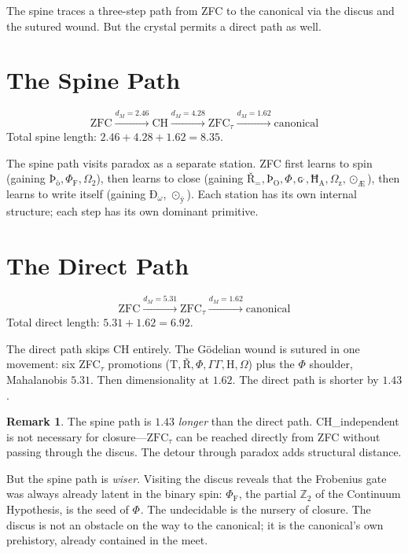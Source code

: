 \documentclass[12pt,twoside]{book}
\theoremstyle{definition}
\newtheorem{remark}[theorem]{Remark}
\newcommand{\ZFCt}{\text{ZFC}_{\tau}}
\newcommand{\prim}[1]{\text{#1}}
\begin{document}
The spine traces a three-step path from ZFC to the canonical via the discus and the sutured wound. But the crystal permits a direct path as well.

\section{The Spine Path}

\begin{equation}
\text{ZFC} \xrightarrow{d_M = 2.46} \text{CH} \xrightarrow{d_M = 4.28} \ZFCt \xrightarrow{d_M = 1.62} \text{canonical}
\end{equation}
Total spine length: $2.46 + 4.28 + 1.62 = 8.35$.

The spine path visits paradox as a separate station. ZFC first learns to spin (gaining $\text{Þ}_{\text{ò}}, \Phi_{\text{F}}, \Omega_{\text{2}}$), then learns to close (gaining $\text{Ř}_{\text{=}}, \text{Þ}_{\text{O}}, \Phi_{\text{}}, \text{ɢ}^{\text{ˌ}}, \text{Ħ}_{\text{A}}, \Omega_{\text{z}}, \odot_{\text{Æ}}$), then learns to write itself (gaining $\text{Ð}_{\omega}$, $\odot_{\text{ÿ}}$). Each station has its own internal structure; each step has its own dominant primitive.

\section{The Direct Path}

\begin{equation}
\text{ZFC} \xrightarrow{d_M = 5.31} \ZFCt \xrightarrow{d_M = 1.62} \text{canonical}
\end{equation}
Total direct length: $5.31 + 1.62 = 6.92$.

The direct path skips CH entirely. The G\"odelian wound is sutured in one movement: six ZFC$_{\tau}$ promotions ($\prim{T}, \text{Ř}, \Phi, \Gamma \!\!\! \Gamma, \prim{H}, \Omega$) plus the $\Phi$ shoulder, Mahalanobis $5.31$. Then dimensionality at $1.62$. The direct path is shorter by $1.43$.

\begin{remark}
The spine path is $1.43$ \emph{longer} than the direct path. CH\_independent is not necessary for closure---$\ZFCt$ can be reached directly from ZFC without passing through the discus. The detour through paradox adds structural distance.
\end{remark}

But the spine path is \emph{wiser}. Visiting the discus reveals that the Frobenius gate was always already latent in the binary spin: $\Phi_{\text{F}}$, the partial $\mathbb{Z}_2$ of the Continuum Hypothesis, is the seed of $\Phi_{\text{}}$. The undecidable is the nursery of closure. The discus is not an obstacle on the way to the canonical; it is the canonical's own prehistory, already contained in the meet.
\end{document}

